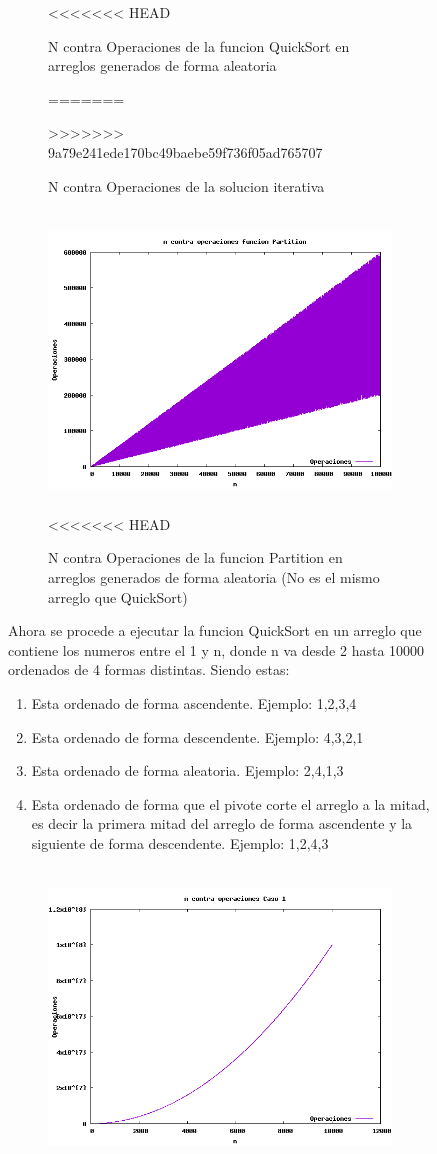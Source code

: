 \documentclass[spanish]{article}
\begin{document}
\begin{figure}[h!]
\begin{figure}[H]
<<<<<<< HEAD
		\caption{N contra Operaciones de la funcion QuickSort en arreglos generados de forma aleatoria}
=======
		\caption{N contra Operaciones de la solucion iterativa}
>>>>>>> 9a79e241ede170bc49baebe59f736f05ad765707
	\end{figure}
	\begin{figure}[H]
		\centering
		\includegraphics[width=400px,height=300px]{grafica2}
<<<<<<< HEAD
		\caption{N contra Operaciones de la funcion Partition en arreglos generados de forma aleatoria (No es el mismo arreglo que QuickSort)}
	\end{figure}	
	Ahora se procede a ejecutar la funcion QuickSort en un arreglo que contiene los numeros entre el 1 y n, donde n va desde 2 hasta 10000 ordenados de 4 formas distintas. Siendo estas:\
	\begin{enumerate}
		\item Esta ordenado de forma ascendente. Ejemplo: 1,2,3,4
		\item Esta ordenado de forma descendente. Ejemplo: 4,3,2,1
		\item Esta ordenado de forma aleatoria. Ejemplo: 2,4,1,3
		\item Esta ordenado de forma que el pivote corte el arreglo a la mitad, es decir la primera mitad del arreglo de forma ascendente y la siguiente de forma descendente. Ejemplo: 1,2,4,3
	\end{enumerate}
	\begin{figure}[H]
		\centering
		\includegraphics[width=400px,height=300px]{grafica3}

\end{figure}
\end{figure}
\end{document}
